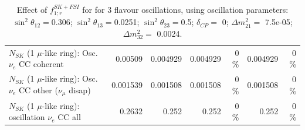 \begin{table}
\begin{tabular}{| l | r | r | r  r | r  r |}
                          $N_{SK}$ (1 $\mu$-like ring): Osc. $\nu_e$ CC coherent &         0.00509 &        0.004929 &        0.004929 &        0 \%  &        0.004929 &        0 \%  \\ 
           $N_{SK}$ (1 $\mu$-like ring): Osc. $\nu_e$ CC other ($\nu_\mu$ disap) &        0.001539 &        0.001508 &        0.001508 &        0 \%  &        0.001508 &        0 \%  \\ 
                        $N_{SK}$ (1 $\mu$-like ring): oscillation $\nu_e$ CC all &          0.2632 &           0.252 &           0.252 &        0 \%  &           0.252 &        0 \%  \\ 
\hline
\hline
\end{tabular}
\caption{ Effect of $f_{1; r}^{SK+FSI}$ for for 3 flavour oscillations, using oscillation parameters:  $\sin^2\theta_{12} = $0.306; $\sin^2\theta_{13} = $0.0251; $\sin^2\theta_{23} = $0.5; $\delta_{CP} = $        0; $\Delta m^2_{21} = $    7.5e-05; $\Delta m^2_{32} = $    0.0024. }
\label{tab:num_skdetfsi_001_1RmuT_3f_osc_t13:0.0251_spectralreco_spectraltrue}
\end{table}
\clearpage
